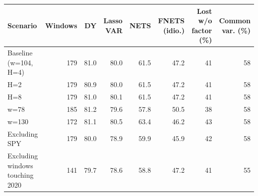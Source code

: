 \begin{tabular}{lrrrrrrr}
\toprule
Scenario & Windows & DY & Lasso VAR & NETS & FNETS (idio.) & Lost w/o factor (\%) & Common var. (\%) \\
\midrule
Baseline (w=104, H=4) & 179 & 81.0 & 80.0 & 61.5 & 47.2 & 41 & 58 \\
H=2 & 179 & 80.9 & 80.0 & 61.5 & 47.2 & 41 & 58 \\
H=8 & 179 & 81.0 & 80.1 & 61.5 & 47.2 & 41 & 58 \\
w=78 & 185 & 81.2 & 79.6 & 57.8 & 50.5 & 38 & 58 \\
w=130 & 172 & 81.1 & 80.5 & 63.4 & 46.2 & 43 & 58 \\
Excluding SPY & 179 & 80.0 & 78.9 & 59.9 & 45.9 & 42 & 58 \\
Excluding windows touching 2020 & 141 & 79.7 & 78.6 & 58.8 & 47.2 & 41 & 55 \\
\bottomrule
\end{tabular}
